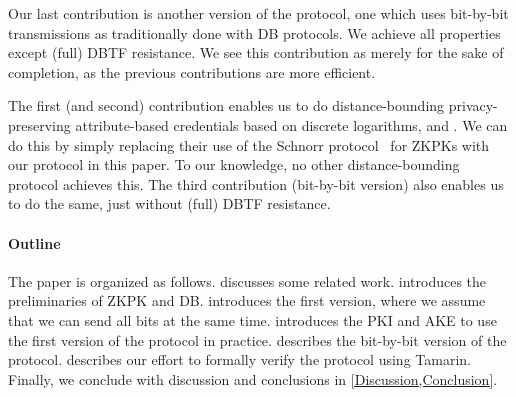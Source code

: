 Our last contribution is another version of the protocol, one which uses 
bit-by-bit transmissions as traditionally done with \ac{DB} protocols.
We achieve all properties except (full) \ac{DBTF} resistance.
We see this contribution as merely for the sake of completion, as the previous 
contributions are more efficient.

The first (and second) contribution enables us to do distance-bounding 
privacy-preserving attribute-based credentials based on discrete logarithms, 
\eg \cite{Camenisch-phdthesis} and \cite{CLsignatures}.
We can do this by simply replacing their use of the Schnorr 
protocol~\cite{Schnorr} for \acp{ZKPK} with our protocol in this paper.
To our knowledge, no other distance-bounding protocol achieves this.
The third contribution (bit-by-bit version) also enables us to do the same, 
just without (full) \ac{DBTF} resistance.

\paragraph*{Outline}

The paper is organized as follows.
 discusses some related work.
 introduces the preliminaries of \ac{ZKPK} and \ac{DB}.
 introduces the first version, where we assume that we can 
send all bits at the same time.
 introduces the \ac{PKI} and \ac{AKE} to use the first 
version of the protocol in practice.
 describes the bit-by-bit version of the protocol.
 describes our effort to formally verify the protocol 
using Tamarin.
Finally, we conclude with discussion and conclusions in 
\cref{Discussion,Conclusion}.
